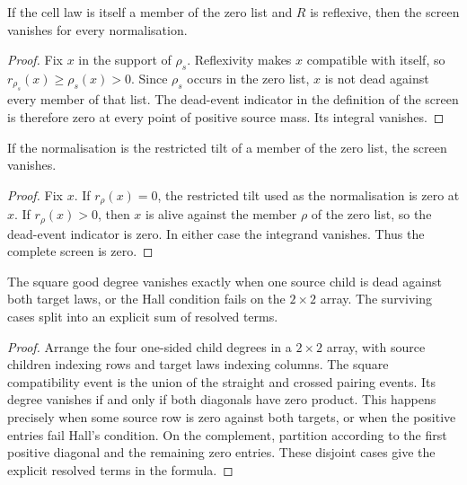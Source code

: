 \begin{lemma}
\label{thm:pruning}
\leanok
{}
If the cell law is itself a member of the zero list and $R$ is reflexive, then the screen
vanishes for every normalisation.
\end{lemma}

\begin{proof}
\leanok
Fix $x$ in the support of $\rho_s$. Reflexivity makes $x$ compatible with itself, so
$r_{\rho_s}(x)\geq\rho_s(x)>0$. Since $\rho_s$ occurs in the zero list, $x$ is not dead
against every member of that list. The dead-event indicator in the definition of the screen is
therefore zero at every point of positive source mass. Its integral vanishes.
\end{proof}

\begin{lemma}
\label{thm:tilt-pruning}
\leanok
{}
If the normalisation is the restricted tilt of a member of the zero list, the screen vanishes.
\end{lemma}

\begin{proof}
\leanok
Fix $x$. If $r_\rho(x)=0$, the restricted tilt used as the normalisation is zero at $x$. If
$r_\rho(x)>0$, then $x$ is alive against the member $\rho$ of the zero list, so the dead-event
indicator is zero. In either case the integrand vanishes. Thus the complete screen is zero.
\end{proof}

\begin{lemma}
\label{thm:hall}
\leanok
{}
The square good degree vanishes exactly when one source child is dead against both target laws,
or the Hall condition fails on the $2\times2$ array. The surviving cases split into an explicit
sum of resolved terms.
\end{lemma}

\begin{proof}
\leanok
{}
Arrange the four one-sided child degrees in a $2\times2$ array, with source children indexing
rows and target laws indexing columns. The square compatibility event is the union of the straight
and crossed pairing events. Its degree vanishes if and only if both diagonals have zero product.
This happens precisely when some source row is zero against both targets, or when the positive
entries fail Hall's condition. On the complement, partition according to the first positive
diagonal and the remaining zero entries. These disjoint cases give the explicit resolved terms in
the formula.
\end{proof}

